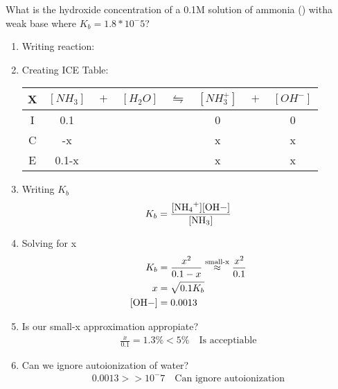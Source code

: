 \documentclass[../CHEM152Notes.tex]{subfiles}
\begin{document}
\begin{exmp}
    What is the hydroxide concentration of a 0.1M solution of ammonia () witha  weak base where $K_b = 1.8*10^-5$?
\end{exmp}
\begin{enumerate}
    \item Writing reaction:
    \item Creating ICE Table:
    \newline
    \begin{tabular}{c|c@{}c@{}c@{}c@{}c@{}c@{}c}
        \hline
        X   & $[NH_3]$ & ${}+{}$ & $[H_2O]$ & ${}\leftrightharpoons{}$ & $[NH_3^+]$ & ${}+{}$ & $[OH^-]$ \\
        \hline
        I   &  0.1   &&     &&  0   && 0  \\
        C   &  -x    &&     &&  x   && x  \\
        E   &  0.1-x &&     &&  x   && x  \\      
    \end{tabular}
    \item Writing $K_b$
    \begin{equation*}
        \begin{aligned}
            K_b &= \ce{\frac{[NH4+][OH-]}{[NH3]}} \\
        \end{aligned}
    \end{equation*}
    \item Solving for x
        \begin{equation*}
            \begin{aligned}
                K_b &= \frac{x^2}{0.1 - x} \stackrel{\text{small-x}}{\approx} \frac{x^2}{0.1} \\
                x   &= \sqrt{0.1 K_b} \\
                \ce{[OH-]} &= 0.0013 
            \end{aligned}
        \end{equation*}
    \item Is our small-x approximation appropiate?
    \begin{equation*}
        \begin{aligned}
            \frac{x}{0.1} = 1.3\% < 5\% \quad \text{Is acceptiable}
        \end{aligned}
    \end{equation*}
    \item Can we ignore autoionization of water?
    \begin{equation*}
        \begin{aligned}
            0.0013 >> 10^-7 \quad \text{Can ignore autoionization}
        \end{aligned}
    \end{equation*}
\end{enumerate}
\end{document}
